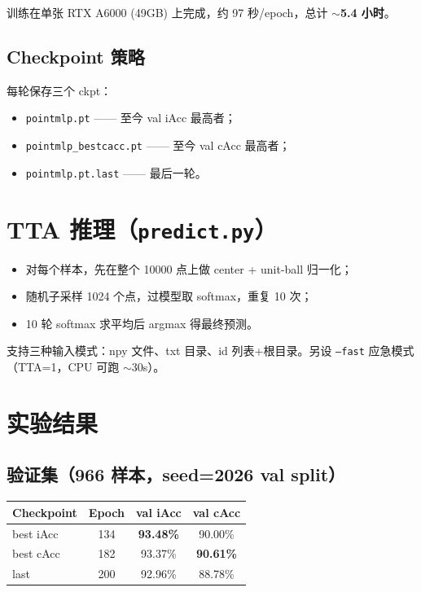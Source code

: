 \documentclass[10pt,a4paper]{ctexart}
\begin{document}
训练在单张 RTX A6000 (49GB) 上完成，约 97 秒/epoch，总计 \textbf{$\sim$5.4 小时}。

\subsection{Checkpoint 策略}
每轮保存三个 ckpt：
\begin{itemize}
\item \texttt{pointmlp.pt} —— 至今 val iAcc 最高者；
\item \texttt{pointmlp\_bestcacc.pt} —— 至今 val cAcc 最高者；
\item \texttt{pointmlp.pt.last} —— 最后一轮。
\end{itemize}

\section{TTA 推理（\texttt{predict.py}）}
\begin{itemize}
\item 对每个样本，先在整个 10000 点上做 center + unit-ball 归一化；
\item 随机子采样 1024 个点，过模型取 softmax，重复 10 次；
\item 10 轮 softmax 求平均后 argmax 得最终预测。
\end{itemize}
支持三种输入模式：npy 文件、txt 目录、id 列表+根目录。另设 \texttt{--fast} 应急模式（TTA=1，CPU 可跑 $\sim$30s）。

\section{实验结果}

\subsection{验证集（966 样本，seed=2026 val split）}

\begin{center}\small
\begin{tabular}{lccc}
\toprule
Checkpoint & Epoch & val iAcc & val cAcc \\
\midrule
best iAcc & 134 & \textbf{93.48\%} & 90.00\% \\
best cAcc & 182 & 93.37\% & \textbf{90.61\%} \\
last      & 200 & 92.96\% & 88.78\% \\
\bottomrule
\end{tabular}
\end{center}
\end{document}
